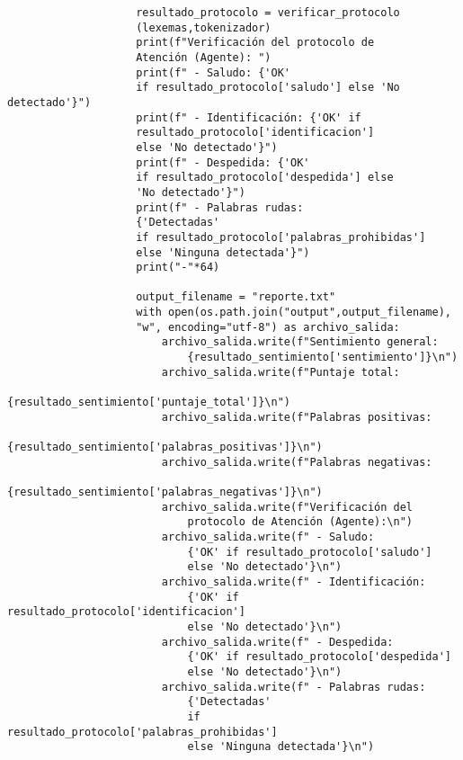 \documentclass[12pt,a4paper]{article}
\begin{document}
\begin{verbatim}
                    resultado_protocolo = verificar_protocolo
                    (lexemas,tokenizador)
                    print(f"Verificación del protocolo de 
                    Atención (Agente): ")
                    print(f" - Saludo: {'OK' 
                    if resultado_protocolo['saludo'] else 'No detectado'}")
                    print(f" - Identificación: {'OK' if 
                    resultado_protocolo['identificacion'] 
                    else 'No detectado'}")
                    print(f" - Despedida: {'OK' 
                    if resultado_protocolo['despedida'] else 
                    'No detectado'}")
                    print(f" - Palabras rudas: 
                    {'Detectadas' 
                    if resultado_protocolo['palabras_prohibidas'] 
                    else 'Ninguna detectada'}")
                    print("-"*64)

                    output_filename = "reporte.txt"
                    with open(os.path.join("output",output_filename), 
                    "w", encoding="utf-8") as archivo_salida:
                        archivo_salida.write(f"Sentimiento general: 
                            {resultado_sentimiento['sentimiento']}\n")
                        archivo_salida.write(f"Puntaje total: 
                            {resultado_sentimiento['puntaje_total']}\n")
                        archivo_salida.write(f"Palabras positivas: 
                            {resultado_sentimiento['palabras_positivas']}\n")
                        archivo_salida.write(f"Palabras negativas: 
                            {resultado_sentimiento['palabras_negativas']}\n")
                        archivo_salida.write(f"Verificación del 
                            protocolo de Atención (Agente):\n")
                        archivo_salida.write(f" - Saludo: 
                            {'OK' if resultado_protocolo['saludo'] 
                            else 'No detectado'}\n")
                        archivo_salida.write(f" - Identificación: 
                            {'OK' if resultado_protocolo['identificacion'] 
                            else 'No detectado'}\n")
                        archivo_salida.write(f" - Despedida: 
                            {'OK' if resultado_protocolo['despedida'] 
                            else 'No detectado'}\n")
                        archivo_salida.write(f" - Palabras rudas: 
                            {'Detectadas' 
                            if resultado_protocolo['palabras_prohibidas'] 
                            else 'Ninguna detectada'}\n")


\end{verbatim}
\end{document}
